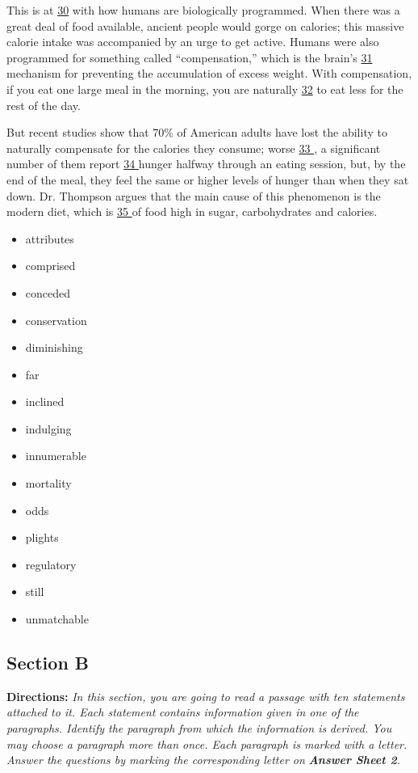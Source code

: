 \documentclass[UTF8,11pt]{ctexart}
\begin{document}
This is at \uline{30} with how humans are biologically programmed. When there was a great deal of food available, ancient people would gorge on calories; this massive calorie intake was accompanied by an urge to get active. Humans were also programmed for something called “compensation,” which is the brain’s \uline{31} mechanism for preventing the accumulation of excess weight. With compensation, if you eat one large meal in the morning, you are naturally \uline{32} to eat less for the rest of the day.


But recent studies show that 70\% of American adults have lost the ability to naturally compensate for the calories they consume; worse \uline{33 }, a significant number of them report \uline{34 }hunger halfway through an eating session, but, by the end of the meal, they feel the same or higher levels of hunger than when they sat down. Dr. Thompson argues that the main cause of this phenomenon is the modern diet, which is \uline{35 }of food high in sugar, carbohydrates and calories.


\begin{itemize}[leftmargin=2em,itemsep=.2em,topsep=.4em]\item[A.] attributes
\item[B.] comprised
\item[C.] conceded
\item[D.] conservation
\item[E.] diminishing
\item[F.] far
\item[G.] inclined
\item[H.] indulging
\item[I.] innumerable
\item[J.] mortality
\item[K.] odds
\item[L.] plights
\item[M.] regulatory
\item[N.] still
\item[O.] unmatchable
\end{itemize}

\subsection*{\textbf{Section B}}


\textbf{Directions:} \textit{In this section, you are going to read a passage with ten statements attached to it. Each statement} \textit{contains information given in one of the paragraphs. Identify the paragraph from which the information is} \textit{derived. You may choose a paragraph more than once. Each paragraph is marked with a letter. Answer the} \textit{questions by marking the corresponding letter on }\textbf{\textit{Answer Sheet 2}}\textit{.}
\end{document}
